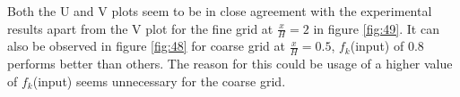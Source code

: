 Both the U and V plots seem to be in close agreement with the experimental results apart from the V plot for the fine grid at \(\frac{x}{H}=2\) in figure \ref{fig:49}. It can also be observed in figure \ref{fig:48} for coarse grid at \(\frac{x}{H}=0.5\), $f_k$(input) of 0.8 performs better than others. The reason for this could be usage of a higher value of $f_k$(input) seems unnecessary for the coarse grid.

